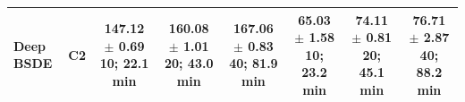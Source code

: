 \documentclass[10pt]{article}
\begin{document}
\begin{table}[t]
\begin{tabular}{llcccccc}
Deep BSDE & C2 & \shortstack{147.12 $\pm$ 0.69\\10; 22.1 min} & \shortstack{160.08 $\pm$ 1.01\\20; 43.0 min} & \shortstack{167.06 $\pm$ 0.83\\40; 81.9 min} & \shortstack{65.03 $\pm$ 1.58\\10; 23.2 min} & \shortstack{74.11 $\pm$ 0.81\\20; 45.1 min} & \shortstack{76.71 $\pm$ 2.87\\40; 88.2 min} \\
\bottomrule
\end{tabular}
\end{table}
\end{document}
